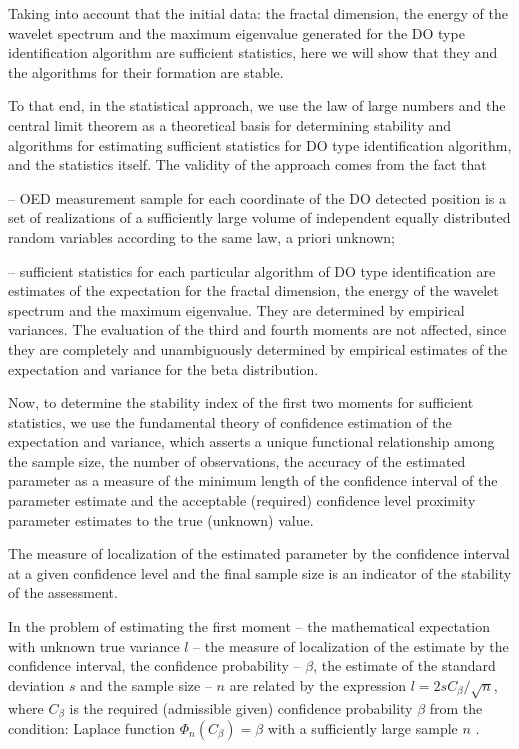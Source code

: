 Taking into account that the initial data: the fractal dimension, the energy of the wavelet spectrum and the maximum eigenvalue generated for the DO type identification algorithm are sufficient statistics, here we will show that they and the algorithms for their formation are stable.

To that end, in the statistical approach, we use the law of large numbers and the central limit theorem as a theoretical basis \cite{bib_11} for determining stability and algorithms for estimating sufficient statistics for DO type identification algorithm, and the statistics itself.
The validity of the approach comes from the fact that

-- OED measurement sample for each coordinate of the DO detected position is a set of realizations of a sufficiently large volume of independent equally distributed random variables according to the same law, a priori unknown;

-- sufficient statistics for each particular algorithm of DO type identification are estimates of the expectation for the fractal dimension, the energy of the wavelet spectrum and the maximum eigenvalue.
They are determined by empirical variances.
The evaluation of the third and fourth moments are not affected, since they are completely and unambiguously determined by empirical estimates of the expectation and variance for the beta distribution.

Now, to determine the stability index of the first two moments for sufficient statistics, we use the fundamental theory of confidence estimation of the expectation and variance, which asserts a unique functional relationship among the sample size, the number of observations, the accuracy of the estimated parameter as a measure of the minimum length of the confidence interval of the parameter estimate and the acceptable (required) confidence level proximity parameter estimates to the true (unknown) value.

The measure of localization of the estimated parameter by the confidence interval at a given confidence level and the final sample size is an indicator of the stability of the assessment.

In the problem of estimating the first moment -- the mathematical expectation with unknown true variance $l$ -- the measure of localization of the estimate by the confidence interval, the confidence probability -- $\beta$, the estimate of the standard deviation $s$ and the sample size -- $n$ are related by the expression $l = 2sC_{\beta}/\sqrt{n}$, where $C_{\beta}$ is the required (admissible given) confidence probability $\beta$ from the condition: Laplace function $\Phi_n(C_{\beta}) = \beta$ with a sufficiently large sample $n$ \cite{bib_13,bib_14}.


